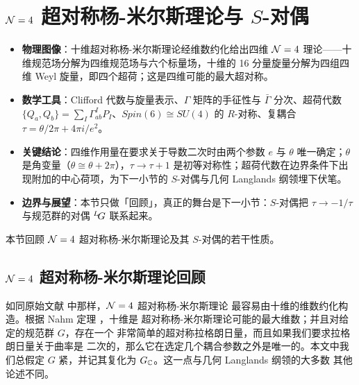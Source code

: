 
\section{${\EUN}=4$ 超对称杨-米尔斯理论与 $S$-对偶}

\label{sec:review}

\begin{keytakeaways}
\begin{itemize}[leftmargin=1.4em,itemsep=2pt,topsep=2pt]
\item \textbf{物理图像}：十维超对称杨-米尔斯理论经维数约化给出四维 ${\EUN}=4$ 理论——十维规范场分解为四维规范场与六个标量场，十维的 16 分量旋量分解为四组四维 Weyl 旋量，即四个超荷；这是四维可能的最大超对称。
\item \textbf{数学工具}：Clifford 代数与旋量表示、$\Gamma$ 矩阵的手征性与 $\bar\Gamma$ 分次、超荷代数 $\{Q_a,Q_b\}=\sum_I\Gamma^I_{ab}P_I$、$Spin(6)\cong SU(4)$ 的 $R$-对称、复耦合 $\tau=\theta/2\pi+4\pi i/e^2$。
\item \textbf{关键结论}：四维作用量在要求关于导数二次时由两个参数 $e$ 与 $\theta$ 唯一确定；$\theta$ 是角变量（$\theta\cong\theta+2\pi$），$\tau\to\tau+1$ 是初等对称性；超荷代数在边界条件下出现附加的中心荷项，为下一小节的 $S$-对偶与几何 Langlands 纲领埋下伏笔。
\item \textbf{边界与展望}：本节只做「回顾」，真正的舞台是下一小节：$S$-对偶把 $\tau\to-1/\tau$ 与规范群的对偶 ${}^L\negthinspace G$ 联系起来。
\end{itemize}
\end{keytakeaways}


 本节回顾 ${\EUN}=4$ 超对称杨-米尔斯理论及其 $S$-对偶的若干性质。

\subsection{${\EUN}=4$ 超对称杨-米尔斯理论回顾}
\label{sec:reviewsym}

如同原始文献 \cite{ref42} 中那样，${\EUN}=4$ 超对称杨-米尔斯理论
最容易由十维的维数约化构造。根据 Nahm 定理 \cite{ref43}，十维是
超对称杨-米尔斯理论可能的最大维数；并且对给定的规范群 $G$，存在一个
非常简单的超对称拉格朗日量，而且如果我们要求拉格朗日量关于曲率是
二次的，那么它在选定几个耦合参数之外是唯一的。本文中我们总假定 $G$
紧，并记其复化为 $G_{\Bbb{C}}$。这一点与几何 Langlands 纲领的大多数
其他论述不同。

